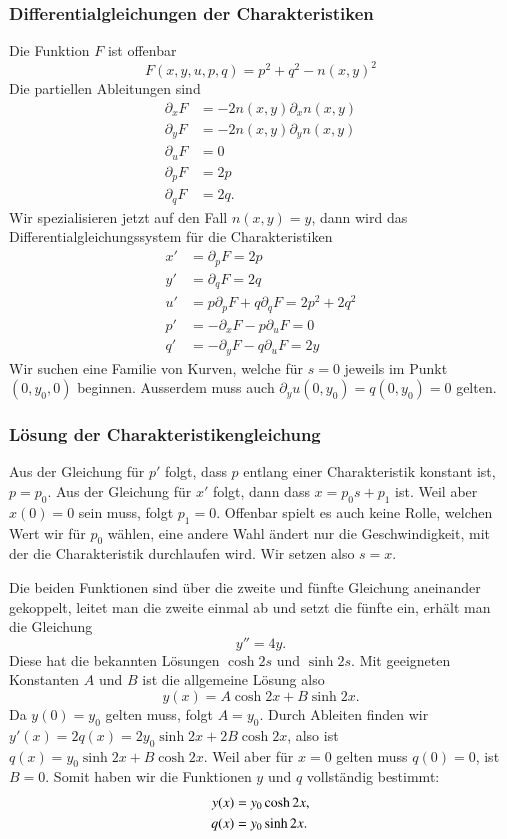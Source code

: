 \subsubsection{Differentialgleichungen der Charakteristiken}
Die Funktion $F$ ist offenbar
\[
F(x,y,u,p,q)=p^2+q^2-n(x,y)^2
\]
Die partiellen Ableitungen sind
\begin{align*}
\partial_xF&=-2n(x,y)\partial_x n(x,y)\\
\partial_yF&=-2n(x,y)\partial_y n(x,y)\\
\partial_uF&=0\\
\partial_pF&=2p\\
\partial_qF&=2q.
\end{align*}
Wir spezialisieren jetzt auf den Fall $n(x,y)=y$, dann wird das 
Differentialgleichungssystem für die Charakteristiken
\begin{align*}
x'&=\partial_pF=2p\\
y'&=\partial_qF=2q\\
u'&=p\partial_pF+q\partial_qF=2p^2+2q^2\\
p'&=-\partial_xF-p\partial_uF=0\\
q'&=-\partial_yF-q\partial_uF=2y
\end{align*}
Wir suchen eine Familie von Kurven, welche für $s=0$ jeweils
im Punkt $(0,y_0,0)$ beginnen.
Ausserdem muss auch $\partial_yu(0,y_0)=q(0,y_0)=0$ gelten.

\subsubsection{Lösung der Charakteristikengleichung}
Aus der Gleichung für $p'$ folgt, dass $p$ entlang einer Charakteristik
konstant ist, $p=p_0$. Aus der Gleichung für $x'$ folgt, dann
dass $x=p_0s+p_1$ ist. Weil aber $x(0)=0$ sein muss, folgt $p_1=0$.
Offenbar spielt es auch keine Rolle, welchen Wert wir für $p_0$
wählen, eine andere Wahl ändert nur die Geschwindigkeit, mit der
die Charakteristik durchlaufen wird. Wir setzen also $s=x$.

Die beiden Funktionen sind über die zweite und fünfte Gleichung
aneinander gekoppelt, leitet man die zweite einmal ab und setzt die
fünfte ein, erhält man die Gleichung
\[
y''=4y.
\]
Diese hat die bekannten Lösungen $\cosh 2s$ und $\sinh 2s$.
Mit geeigneten Konstanten $A$ und $B$ ist die allgemeine
Lösung also
\[
y(x)=A\cosh 2x + B\sinh 2x.
\]
Da $y(0)=y_0$ gelten muss, folgt $A=y_0$. Durch Ableiten finden wir
$y'(x)=2q(x)=2y_0\sinh 2x + 2B\cosh 2x$, also ist $q(x)=y_0\sinh 2x+B\cosh 2x$. 
Weil aber für $x=0$ gelten muss $q(0)=0$, ist $B=0$.
Somit haben wir die Funktionen $y$ und $q$ vollständig bestimmt:
\begin{align}
y(x)&=y_0\cosh 2x,
\label{nichtlinear:y}
\\
q(x)&=y_0\sinh 2x.\notag
\end{align}

